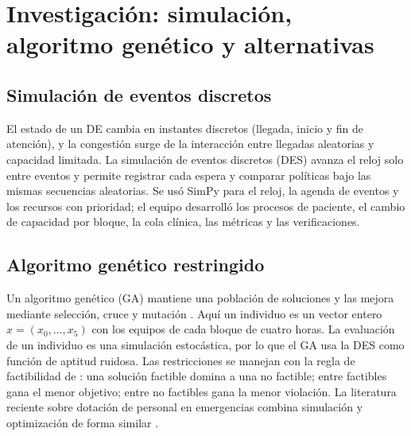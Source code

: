 \section{Investigación: simulación, algoritmo genético y alternativas}

\subsection{Simulación de eventos discretos}
El estado de un DE cambia en instantes discretos (llegada, inicio y fin de atención), y la
congestión surge de la interacción entre llegadas aleatorias y capacidad limitada. La
simulación de eventos discretos (DES) avanza el reloj solo entre eventos y permite registrar
cada espera y comparar políticas bajo las mismas secuencias aleatorias. Se usó SimPy
\citep{simpy412} para el reloj, la agenda de eventos y los recursos con prioridad; el
equipo desarrolló los procesos de paciente, el cambio de capacidad por bloque, la cola
clínica, las métricas y las verificaciones.

\subsection{Algoritmo genético restringido}
Un algoritmo genético (GA) mantiene una población de soluciones y las mejora mediante
selección, cruce y mutación \citep{eiben2015evolutionary}. Aquí un individuo es un vector
entero $x=(x_0,\dots,x_5)$ con los equipos de cada bloque de cuatro horas. La evaluación
de un individuo es una simulación estocástica, por lo que el GA usa la DES como función de
aptitud ruidosa. Las restricciones se manejan con la regla de factibilidad de
\citet{deb2000constraints}: una solución factible domina a una no factible; entre factibles
gana el menor objetivo; entre no factibles gana la menor violación. La literatura reciente
sobre dotación de personal en emergencias combina simulación y optimización de forma
similar \citep{wang2025staffing}.

